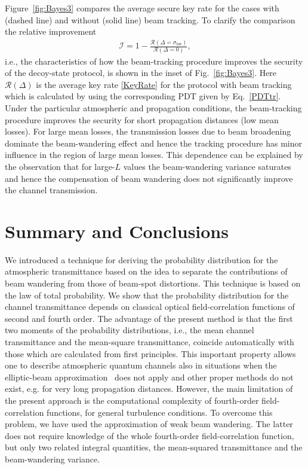 \documentclass[aps,pra,twocolumn,a4paper,nofootinbib,preprintnumbers] {revtex4-1}
\begin{document}
      Figure~\ref{fig:Bayes3}  compares the average secure key rate for the cases with (dashed line) and without (solid line) beam tracking.
      To clarify  the comparison  the relative improvement
	    \begin{align}\label{RelativeImpr}
	     \mathcal{I}=1-\frac{\mathcal{R}(\Delta{=}\sigma_{\mathrm{bw}})}{\mathcal{R}(\Delta=0)},
	    \end{align}
      i.e., the characteristics of how the beam-tracking procedure improves the security of the decoy-state protocol, is shown in the inset of Fig.~\ref{fig:Bayes3}.
      Here $\mathcal{R}(\Delta)$ is the average key rate \eqref{KeyRate} for the protocol with beam tracking which is calculated by using the corresponding PDT given by Eq.~\eqref{PDTtr}.
      Under the particular atmospheric and propagation conditions, the beam-tracking procedure improves  the security for short propagation distances (low mean losses).
      For large mean losses, the transmission losses due to beam broadening dominate the beam-wandering effect and hence the tracking procedure has  minor influence in the region of large mean losses.
      This dependence can be explained by the observation that for large-$L$ values the beam-wandering variance saturates~\cite{Mironov1976} and hence the compensation of beam wandering does not significantly improve the channel transmission.





\section{Summary and Conclusions} \label{sec:Summary}

	We introduced a technique for deriving the probability distribution for the atmospheric transmittance based on the idea to separate the contributions of beam wandering from those of beam-spot distortions.
	This technique is based on the law of total probability.
	We show that the probability distribution for the channel transmittance depends on classical optical field-correlation functions of second and fourth order.
	The advantage of the present method is that the first two moments of the probability distributions, i.e., the mean channel transmittance and the mean-square transmittance, coincide automatically with those which are calculated from  first principles.
	This important property allows one to describe  atmospheric quantum channels also in situations when the elliptic-beam approximation~\cite{Vallone2016} does not apply and other proper methods do not exist, e.g. for  very long propagation distances.
	However, the main limitation of the present approach is the computational complexity of fourth-order field-correlation functions, for general turbulence conditions.
	To overcome this problem, we have used the approximation of weak beam wandering.
	The latter does not require knowledge of the whole fourth-order field-correlation function, but only two related integral quantities, the mean-squared transmittance and the beam-wandering variance.
	
\end{document}
